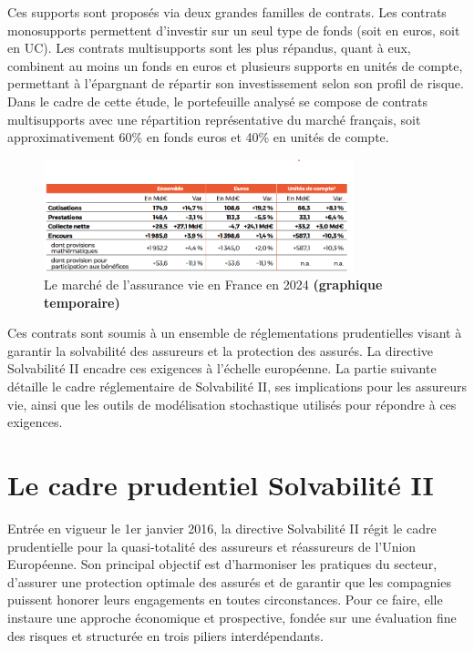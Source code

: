 Ces supports sont proposés via deux grandes familles de contrats. Les contrats monosupports permettent d'investir sur un seul type de fonds (soit en euros, soit en UC). Les contrats multisupports sont les plus répandus, quant à eux, combinent au moins un fonds en euros et plusieurs supports en unités de compte, permettant à l'épargnant de répartir son investissement selon son profil de risque. Dans le cadre de cette étude, le portefeuille analysé se compose de contrats multisupports avec une répartition représentative du marché français, soit approximativement 60\% en fonds euros et 40\% en unités de compte.
\begin{figure}[H]
    \centering
    \includegraphics[width=0.8\textwidth]{images/2_chapitres/chapitre1/assurance-vie-stats.png}
    \caption{Le marché de l'assurance vie en France en 2024 \textbf{(graphique temporaire)}}
    \label{fig:marches_assurance_vie}
\end{figure}

Ces contrats sont soumis à un ensemble de réglementations prudentielles visant à garantir la solvabilité des assureurs et la protection des assurés. La directive Solvabilité II encadre ces exigences à l'échelle européenne. La partie suivante détaille le cadre réglementaire de Solvabilité II, ses implications pour les assureurs vie, ainsi que les outils de modélisation stochastique utilisés pour répondre à ces exigences.

\section{Le cadre prudentiel Solvabilité II}
\label{sec:s2}

Entrée en vigueur le 1er janvier 2016, la directive Solvabilité II régit le cadre prudentielle pour la quasi-totalité des assureurs et réassureurs de l'Union Européenne. Son principal objectif est d'harmoniser les pratiques du secteur, d'assurer une protection optimale des assurés et de garantir que les compagnies puissent honorer leurs engagements en toutes circonstances. Pour ce faire, elle instaure une approche économique et prospective, fondée sur une évaluation fine des risques et structurée en trois piliers interdépendants.


